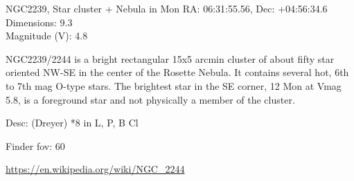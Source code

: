 \begin{block}{NGC2239, Star cluster + Nebula in Mon}
    RA: 06:31:55.56, Dec: +04:56:34.6 \\ 
    Dimensions: 9.3 \\ 
    Magnitude (V): 4.8

    NGC2239/2244 is a bright rectangular 15x5 arcmin cluster of about fifty
    star oriented NW-SE in the center of the Rosette Nebula. It contains
    several hot, 6th to 7th mag O-type stars. The brightest star in the SE
    corner, 12 Mon at Vmag 5.8, is a foreground star and not physically a
    member of the cluster.

    Desc: (Dreyer) *8 in L, P, B Cl 

    Finder fov: 60 

    \url{https://en.wikipedia.org/wiki/NGC_2244} 
\end{block}
